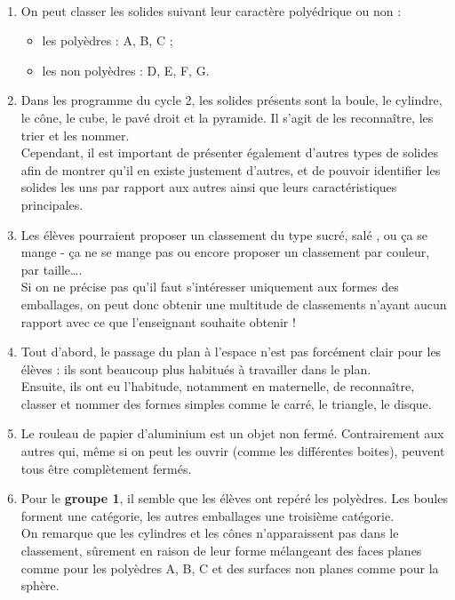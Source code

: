\ \\ [-5mm]
\begin{enumerate}
   \item On peut classer les solides suivant leur caractère polyédrique ou non :
   \begin{itemize}
      \item les polyèdres : A, B, C ;
      \item les non polyèdres : D, E, F, G.
   \end{itemize}
   \item Dans les programme du cycle 2, les solides présents sont la boule, le cylindre, le cône, le cube, le pavé droit et la pyramide. Il s'agit de les reconnaître, les trier et les nommer. \\
   Cependant, il est important de présenter également d'autres types de solides afin de montrer qu'il en existe justement d'autres, et de pouvoir identifier les solides les uns par rapport aux autres ainsi que leurs caractéristiques principales.
   \item Les élèves pourraient proposer un classement du type \og sucré, salé \fg{}, ou \og ça se mange - ça ne se mange pas \fg{} ou encore proposer un classement par couleur, par taille\dots. \\
   Si on ne précise pas qu'il faut s'intéresser uniquement aux formes des emballages, on peut donc obtenir une multitude de classements n'ayant aucun rapport avec ce que l'enseignant souhaite obtenir !
     \item Tout d'abord, le passage du plan à l'espace n'est pas forcément clair pour les élèves : ils sont beaucoup plus habitués à travailler dans le plan. \\
     Ensuite, ils ont eu l'habitude, notamment en maternelle, de reconnaître, classer et nommer des formes simples comme le carré, le triangle, le disque.
   \item Le rouleau de papier d'aluminium est un objet non fermé. Contrairement aux autres qui, même si on peut les ouvrir (comme les différentes boites), peuvent tous être complètement fermés.
   \item Pour le \textbf{groupe 1}, il semble que les élèves ont \og repéré \fg{} les polyèdres. Les boules forment une catégorie, les autres emballages une troisième catégorie. \\
   On remarque que les cylindres et les cônes n'apparaissent pas dans le classement, sûrement en raison de leur forme mélangeant des faces planes comme pour les polyèdres A, B, C et des surfaces non planes comme pour la sphère.  \\

\end{enumerate}
